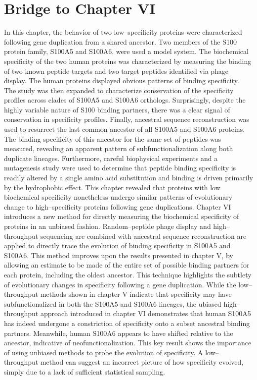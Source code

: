 \section{Bridge to Chapter VI}
In this chapter, the behavior of two low--specificity proteins were characterized following gene duplication from a shared ancestor. Two members of the S100 protein family, S100A5 and S100A6, were used a model system. The biochemical specificity of the two human proteins was characterized by measuring the binding of two known peptide targets and two target peptides identified via phage display. The human proteins displayed obvious patterns of binding specificity. The study was then expanded to characterize conservation of the specificity profiles across clades of S100A5 and S100A6 orthologs. Surprisingly, despite the highly variable nature of S100 binding partners, there was a clear signal of conservation in specificity profiles. Finally, ancestral sequence reconstruction was used to resurrect the last common ancestor of all S100A5 and S100A6 proteins. The binding specificity of this ancestor for the same set of peptides was measured, revealing an apparent pattern of subfunctionalization along both duplicate lineages. Furthermore, careful biophysical experiments and a mutagenesis study were used to determine that peptide binding specificity is readily altered by a single amino acid substitution and binding is driven primarily by the hydrophobic effect. This chapter revealed that proteins with low biochemical specificity nonetheless undergo similar patterns of evolutionary change to high--specificity proteins following gene duplications. Chapter VI introduces a new method for directly measuring the biochemical specificity of proteins in an unbiased fashion. Random--peptide phage display and high--throughput sequencing are combined with ancestral sequence reconstruction are applied to directly trace the evolution of binding specificity in S100A5 and S100A6. This method improves upon the results presented in chapter V, by allowing an estimate to be made of the entire set of possible binding partners for each protein, including the oldest ancestor. This technique highlights the subtlety of evolutionary changes in specificity following a gene duplication. While the low--throughput methods shown in chapter V indicate that specificity may have subfunctionalized in both the S100A5 and S100A6 lineages, the ubiased high--throughput approach introduced in chapter VI demonstrates that  human S100A5 has indeed undergone a constriction of specificity onto a subset ancestral binding partners. Meanwhile, human S100A6 appears to have shifted relative to the ancestor, indicative of neofunctionalization. This key result shows the importance of using unbiased methods to probe the evolution of specificity. A low--throughput method can suggest an incorrect picture of how specificity evolved, simply due to a lack of sufficient statistical sampling. 

